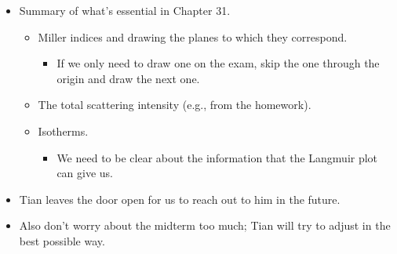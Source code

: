 \documentclass[../notes.tex]{subfiles}
\begin{document}
\begin{itemize}
\begin{itemize}
        \item Mechanism.
        \begin{align*}
            \ce{H2(g) + 2S(s)} &\Longleftrightarrows \ce{2H(ads)}\\[-1.6em]
            \ce{N2(g)} &\Longleftrightarrows \ce{N2(ads)}\\[-1.6em]
            \ce{N2(ads) + 2S(s)} &\Longleftrightarrows \ce{2N(ads)}\\[-1.6em]
            \ce{N(ads) + H(ads)} &\Longleftrightarrows \ce{NH(ads)}\\[-1.6em]
            \ce{NH(ads) + H(ads)} &\Longleftrightarrows \ce{NH2(ads)}\\[-1.6em]
            \ce{NH2(ads) + H(ads)} &\Longleftrightarrows \ce{NH3(ads)}\\[-1.6em]
            \ce{NH3(ads)} &\Longleftrightarrows \ce{NH3(g)}\\[-1.6em]
        \end{align*}
        \begin{itemize}
            \item Splitting nitrogen is the hardest part.
            \item The second step is physisorption.
            \item The third step is dissociative chemisorption.
        \end{itemize}
        \item The relative rates of ammonia synthesis for different transition metal catalysts can be plotted.
        \begin{itemize}
            \item The shape of the plotted data is influenced by the opposing effects of the strength of the surface nitrogen bond and the activation energy of the dissociative chemisorption of .
        \end{itemize}
    \end{itemize}
    \item Summary of what's essential in Chapter 31.
    \begin{itemize}
        \item Miller indices and drawing the planes to which they correspond.
        \begin{itemize}
            \item If we only need to draw one on the exam, skip the one through the origin and draw the next one.
        \end{itemize}
        \item The total scattering intensity (e.g., from the homework).
        \item Isotherms.
        \begin{itemize}
            \item We need to be clear about the information that the Langmuir plot can give us.
        \end{itemize}
    \end{itemize}
    \item Tian leaves the door open for us to reach out to him in the future.
    \item Also don't worry about the midterm too much; Tian will try to adjust in the best possible way.
\end{itemize}
\end{document}
